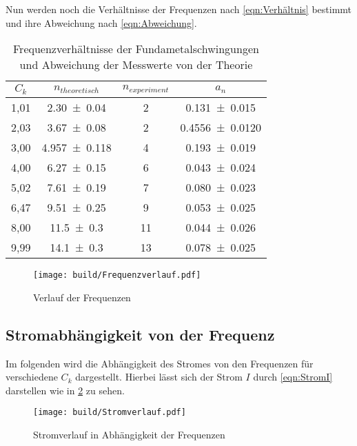 Nun werden noch die Verhältnisse der Frequenzen nach \ref{eqn:Verhältnis} bestimmt und ihre Abweichung nach \ref{eqn:Abweichung}.
\begin{table}[H]
    \centering
    \begin{tabular}{c c c c}
        \toprule
        $C_k$    &   $n_{theoretisch}$ & $n_{experiment}$ & $a_n$\\
        \midrule
        1,01 & \num{2,30\pm 0,04}     & \num{2}        & \num{0,131\pm 0,015}\\        
        2,03 & \num{3,67\pm 0,08}     & \num{2}        & \num{0,4556\pm 0,0120}\\
        3,00 & \num{4,957\pm 0,118}   & \num{4}        & \num{0,193\pm 0,019}\\
        4,00 & \num{6,27\pm 0,15}     & \num{6}        & \num{0,043\pm 0,024}\\
        5,02 & \num{7,61\pm 0,19}     & \num{7}        & \num{0,080\pm 0,023}\\
        6,47 & \num{9,51\pm 0,25}     & \num{9}        & \num{0,053\pm 0,025}\\
        8,00 & \num{11,5\pm 0,3}      & \num{11}       & \num{0,044\pm 0,026}\\       
        9,99 & \num{14,1\pm 0,3}      & \num{13}       & \num{0,078\pm 0,025}\\
       \bottomrule
    \end{tabular}
    \caption{Frequenzverhältnisse der Fundametalschwingungen und Abweichung der Messwerte von der Theorie}
    \label{tab:Frequenzverhältnisse}
\end{table}

\begin{figure}[H]
    \centering
    \texttt{[image: build/Frequenzverlauf.pdf]}
    \caption{Verlauf der Frequenzen}
    \label{fig:frequenzverlauf}
\end{figure}

\subsection{Stromabhängigkeit von der Frequenz}
Im folgenden wird die Abhängigkeit des Stromes von den Frequenzen für verschiedene $C_k$ dargestellt.
Hierbei lässt sich der Strom $I$ durch \ref{eqn:StromI} darstellen wie in \ref{fig:Stromverlauf} zu sehen.
\begin{figure}
    \centering
    \texttt{[image: build/Stromverlauf.pdf]}
    \caption{Stromverlauf in Abhängigkeit der Frequenzen}
    \label{fig:Stromverlauf}
\end{figure}

